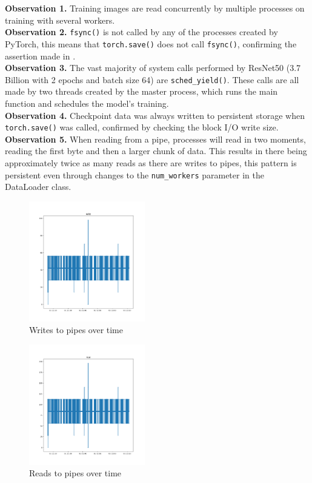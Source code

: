 \documentclass[conference]{IEEEtran}
\begin{document}
\hspace{-0.55cm} \textbf{Observation 1.} Training images are read concurrently by multiple processes on training with several workers.
\\
\textbf{Observation 2.} \texttt{fsync()} is not called by any of the processes created by PyTorch, this means that \texttt{torch.save()} does not call \texttt{fsync()}, confirming the assertion made in \cite{checkfreq}.
\\
\textbf{Observation 3.} The vast majority of system calls performed by ResNet50 (3.7 Billion with 2 epochs and batch size 64) are \texttt{sched\_yield()}. These calls are all made by two threads created by the master process, which runs the main function and schedules the model's training.
\\
\textbf{Observation 4.} Checkpoint data was always written to persistent storage when \texttt{torch.save()} was called, confirmed by checking the block I/O write size.
\\
\textbf{Observation 5.} When reading from a pipe, processes will read in two moments, reading the first byte and then a larger chunk of data. This results in there being approximately twice as many reads as there are writes to pipes, this pattern is persistent even through changes to the \texttt{num\_workers} parameter in the DataLoader class.
\begin{figure}[htbp]
	\centering
	\includegraphics[width=0.45\textwidth]{images/write_pipe.png}
	\caption{Writes to pipes over time}
	\label{fig:pipewrite}
\end{figure}
\begin{figure}[htbp]
	\centering
	\includegraphics[width=0.45\textwidth]{images/read_pipe.png}
	\caption{Reads to pipes over time}
	\label{fig:piperead}
\end{figure}
\end{document}
